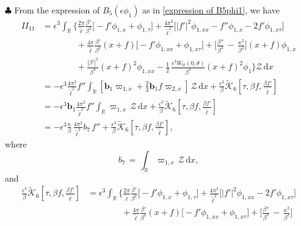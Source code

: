 \documentclass[10pt, reqno]{amsart}
\numberwithin{equation}{section}
\theoremstyle{definition}
\begin{document}
{\smallskip\noindent
$\clubsuit$ From the expression of $B_{5}(\epsilon \phi_1)$ as in \eqref{expression of B5phi1}, we have
\begin{align}\label{B5phi1 intergral Z}
II_{11}
& =
\epsilon^3
\int_{\mathbb R}
\Bigg\{\frac{2\pi}{{\tilde\ell}}\frac{\beta'} {\beta^2}\Big[- f' \phi_{1,x} +\phi_{1,\tau}\Big]
 +\frac{4\pi^2}{{\tilde\ell}^2}\Big[|f'|^2 \phi_{1,xx} -f''\phi_{1,x} -2f' \phi_{1,x\tau}\Big]
\nonumber\\[2mm]
&
\qquad\qquad + \frac{4\pi}{{\tilde\ell}} \frac{\beta'}{\beta^2} (x+f)\big[- f' \phi_{1,xx} +\phi_{1,x\tau}\big]
+\Big[\frac{\beta''}{\beta^3} \,-\,\frac{\kappa^2}{\beta^2} \Big]
(x+f) \phi_{1,x}
\nonumber\\[2mm]
&
\qquad\qquad + \frac{|\beta'|^2}{\beta^4}(x+f)^2 \phi_{1,xx}
-\frac{1}{2}\, \frac{\epsilon^2W_{tt}(0, \theta)}{\beta^4} (x+f)^2\phi_{1}
\Bigg\} {\mathcal Z} \,{\mathrm d}x
\nonumber\\[2mm]
& = - \epsilon^3 \frac{4\pi^2}{{\tilde\ell}^2} f'' \int_{{\mathbb R}} \left[{\mathbf b}_1\varpi_{1,x} +\frac{2}{3}{\mathbf b}_1 f \varpi_{2,x} \right]\, \mathcal Z \,{\mathrm d}x + \frac{\epsilon^3}{\beta}\tilde{\mathcal K}_6\left[\tau, \beta{ f}, \frac{\beta{f}'}{\tilde\ell}\right]
\nonumber\\[2mm]
& = - \epsilon^3 {\mathbf b}_1\frac{4\pi^2}{{\tilde\ell}^2} f'' \int_{{\mathbb R}} \varpi_{1,x} \, \mathcal Z \,{\mathrm d}x
+ \frac{\epsilon^3}{\beta}\tilde{\mathcal K}_6\left[\tau, \beta{ f}, \frac{\beta{f}'}{\tilde\ell}\right]
\nonumber\\[2mm]
& = - \epsilon^3 \frac{\kappa }{\beta}\,\frac{4\pi^2}{{\tilde\ell}^2} b_7\,f''
+ \frac{\epsilon^3}{\beta}\tilde{\mathcal K}_6\left[\tau, \beta{ f}, \frac{\beta{f}'}{\tilde\ell}\right],
\end{align}
where
\begin{equation*}
b_7\,=\, \int_{{\mathbb R}} \varpi_{1,x} \, \mathcal Z \,{\mathrm d}x,
\end{equation*}
and
\begin{align*}
\frac{\epsilon^3}{\beta}\tilde{\mathcal K}_6\left[\tau, \beta{ f}, \frac{\beta{f}'}{\tilde\ell}\right] & =
\epsilon^3
\int_{\mathbb R}
\Bigg\{\frac{2\pi}{{\tilde\ell}}\frac{\beta'} {\beta^2}\Big[- f' \phi_{1,x} +\phi_{1,\tau}\Big]
 +\frac{4\pi^2}{{\tilde\ell}^2}\Big[|f'|^2 \phi_{1,xx} -2f' \phi_{1,x\tau}\Big]
\nonumber\\[2mm]
&
\qquad\qquad + \frac{4\pi}{{\tilde\ell}} \frac{\beta'}{\beta^2} (x+f)\big[- f' \phi_{1,xx} +\phi_{1,x\tau}\big]
+\Big[\frac{\beta''}{\beta^3} \,-\,\frac{\kappa^2}{\beta^2} \Big]

\end{align*}}
\end{document}
